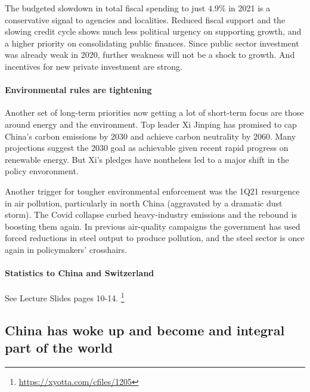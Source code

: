 \vspace{1\baselineskip}

The budgeted slowdown in total fiscal spending to just $4.9\%$ in 2021 is
a conservative signal to agencies and localities. Reduced fiscal support and
the slowing credit cycle shows much less political urgency on supporting
growth, and a higher priority on consolidating public finances. Since
public sector investment was already weak in 2020, further weakness will not
be a shock to growth. And incentives for new private investment are strong.

\paragraph{Environmental rules are tightening}

Another set of long-term priorities now getting a lot of short-term focus
are those around energy and the environment. Top leader Xi Jinping has
promised to cap China's carbon emissions by 2030 and achieve carbon
neutrality by 2060. Many projections suggest the 2030 goal as achievable
given recent rapid progress on renewable energy. But Xi's pledges have
nontheless led to a major shift in the policy envoronment.

\vspace{1\baselineskip}

Another trigger for tougher environmental enforcement was the 1Q21
resurgence in air pollution, particularly in north China (aggravated
by a dramatic dust storm). The Covid collapse curbed heavy-industry
emissions and the rebound is boosting them again. In previous air-quality
campaigns the government has used forced reductions in steel output to
produce pollution, and the steel sector is once again in policymakers'
crosshairs.

\paragraph{Statistics to China and Switzerland}
See Lecture Slides pages 10-14. \footnote{\url{https://xyotta.com/cfiles/1205}}


\subsection{China has woke up and become and integral part of the world}

